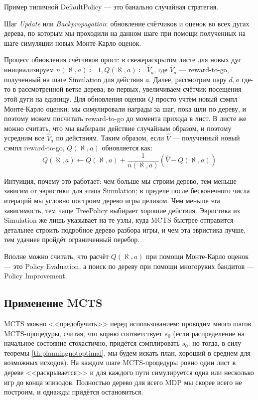 \begin{example}
Пример типичной DefaultPolicy --- это банально случайная стратегия. 
\end{example}

\begin{definition}
    Шаг \emph{Update} или \emph{Backpropagation}: обновление счётчиков и оценок во всех дугах дерева, по которым мы проходили на данном шаге при помощи полученных на шаге симуляции новых Монте-Карло оценок.
\end{definition}

\begin{example}
Процесс обновления счётчиков прост: в свежераскрытом листе для новых дуг инициализируем $n(\aleph, a) \coloneqq 1, Q(\aleph, a) \coloneqq \hat{V}_a$, где $\hat{V}_a$ --- reward-to-go, полученный на шаге Simulation для действия $a$. Далее, рассмотрим пару $d, a$ где-то в рассмотренной ветке дерева; во-первых, увеличиваем счётчик посещения этой дуги на единицу. Для обновления оценки $Q$ просто учтём новый сэмпл Монте-Карло оценки: мы симулировали награды за шаг, пока шли по дереву, и поэтому можем посчитать reward-to-go до момента прихода в лист. В листе же можно считать, что мы выбирали действие случайным образом, и поэтому усредним все $\hat{V}_a$ по действиям. Таким образом, если $\hat{V}$ --- полученный новый сэмпл reward-to-go, $Q(\aleph, a)$ обновляется как:
$$Q(\aleph, a) \leftarrow Q(\aleph, a) + \frac{1}{n(\aleph, a)}(\hat{V} - Q(\aleph, a))$$
\end{example}

Интуиция, почему это работает: чем больше мы строим дерево, тем меньше зависим от эвристики для этапа Simulation; в пределе после бесконечного числа итераций мы условно построим дерево игры целиком. Чем меньше эта зависимость, тем чаще TreePolicy выбирает хорошие действия. Эвристика из Simulation же лишь указывает на те узлы, куда MCTS быстрее отправится детальнее строить подробное дерево разбора игры, и чем эта эвристика лучше, тем удачнее пройдёт ограниченный перебор.

Вполне можно считать, что расчёт $Q(\aleph, a)$ при помощи Монте-Карло оценок --- это Policy Evaluation, а поиск по дереву при помощи многоруких бандитов --- Policy Improvement.

\subsection{Применение MCTS}

MCTS можно <<предобучить>> перед использованием: проводим много шагов MCTS-процедуры, считая, что корню соответствует $s_0$ (если распределение на начальное состояние стохастично, придётся сэмплировать $s_0$: но тогда, в силу теоремы \ref{th:planningnotoptimal}, мы будем искать план, хороший в среднем для возможных исходов). На каждом шаге MCTS-процедуры ровно один лист в дереве <<раскрывается>> и для каждого пути симулируется одна или несколько игр до конца эпизодов. Полностью дерево для всего MDP мы скорее всего не построим, и однажды придётся остановиться.

